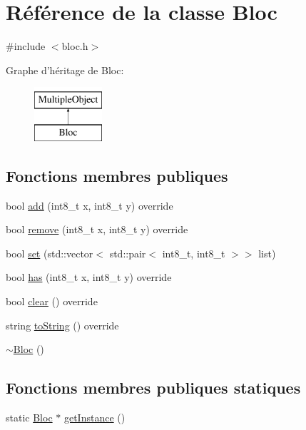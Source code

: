 \hypertarget{classBloc}{\section{Référence de la classe Bloc}
\label{classBloc}
}


{\ttfamily \#include $<$bloc.\-h$>$}

Graphe d'héritage de Bloc\-:\begin{figure}[H]
\begin{center}
\leavevmode
\includegraphics[height=2.000000cm]{classBloc}
\end{center}
\end{figure}
\subsection*{Fonctions membres publiques}
\begin{DoxyCompactItemize}
\item 
bool \hyperlink{classBloc_a02db4c95699ce40e8ad671ef759ebdb7}{add} (int8\-\_\-t x, int8\-\_\-t y) override
\item 
bool \hyperlink{classBloc_a259248faed302444ba5424cdf6178681}{remove} (int8\-\_\-t x, int8\-\_\-t y) override
\item 
bool \hyperlink{classBloc_a8e62a350fb01ea58c9a8bb4deb08639e}{set} (std\-::vector$<$ std\-::pair$<$ int8\-\_\-t, int8\-\_\-t $>$$>$ list)
\item 
bool \hyperlink{classBloc_a03799c83e18411ab4ae4bf3e03aec975}{has} (int8\-\_\-t x, int8\-\_\-t y) override
\item 
bool \hyperlink{classBloc_afa48be18bb2cd4e3240f4a165abef1c8}{clear} () override
\item 
string \hyperlink{classBloc_a040af8a2aefc1acaa0e2d9bfc5943fa3}{to\-String} () override
\item 
\hyperlink{classBloc_a1f40a68b1acb741fc91e07bbaa61dc22}{$\sim$\-Bloc} ()
\end{DoxyCompactItemize}
\subsection*{Fonctions membres publiques statiques}
\begin{DoxyCompactItemize}
\item 
static \hyperlink{classBloc}{Bloc} $\ast$ \hyperlink{classBloc_af357c5eeff01b5b41d983b1e42f5c115}{get\-Instance} ()
\end{DoxyCompactItemize}
